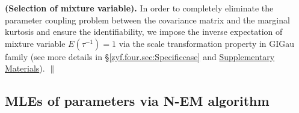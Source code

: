 \begin{remark}{\rm \textbf{(Selection of mixture variable).} In order to completely eliminate the parameter coupling problem between the covariance matrix and the marginal kurtosis and ensure the identifiability, we impose the inverse expectation of mixture variable $E(\tau^{-1}) = 1$ via the scale transformation property in GIGau family (see more details in \S\ref{zyf.four.sec:Specificcase} and \hyperref[zyf.four.sec:SM]{Supplementary Materials}). \hfill$\|$
}\end{remark}

\subsection{MLEs of parameters via N-EM algorithm}\label{zyf.four.sec:NEM}      %

